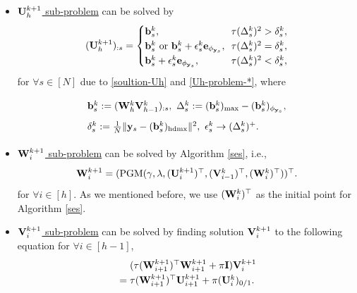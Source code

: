 \documentclass[journal]{IEEEtran}
\def\I{{\bf I}}
\def\U{{\bf U}}
\def\V{{\bf V}}
\def\W{{\bf W}}
\def\b{{\bf b}}
\def\e{{\bf e}}
\def\hd{{\rm hdmx}}
\def\y{{\bf y}}
\begin{document}
\begin{itemize}[leftmargin=10pt]
\item \underline{$\U_h^{k+1}$ sub-problem} can be solved by
\begin{eqnarray}\label{soultion-Uh-k1}
 \arraycolsep=0pt\def\arraystretch{1.25}
 (\U_h^{k+1})_{:s}=  \left\{\begin{array}{lll}
\b^{k}_s, & \tau  (\Delta_s^k)^2 > \delta_s^k,\\
\b^{k}_s~ \text{or}~\b^{k}_s+\epsilon^{k}_s \e_{\phi_{\y_s}}, ~~& \tau (\Delta_s^k)^2  = \delta_s^k,\\
 \b^{k}_s+\epsilon^{k}_s \e_{{\phi_{\y_s}}}, & \tau  (\Delta_s^k)^2  < \delta_s^k,
\end{array}\right.
\end{eqnarray}
for $\forall s\in[N]$ due to \eqref{soultion-Uh} and \eqref{Uh-problem-*}, where
\begin{eqnarray*}
 \arraycolsep=1.4pt\def\arraystretch{1.75}
\begin{array}{l}
\b^{k}_s:=(\W_h^{k}\V_{h-1}^{k})_{:s},~\Delta_s^k:=(\b^{k}_s)_{\max}-(\b^{k}_s)_{\phi_{\y_s}}, \\
\delta_s^k:=\frac{1}{N}\|\y_s-(\b^{k}_s)_\hd \|^2,~ \epsilon^{k}_s\to(\Delta_s^k)^+.
\end{array}
\end{eqnarray*}
\item \underline{$\W_i^{k+1}$ sub-problem} can be solved by Algorithm \ref{ses}, i.e.,
\begin{eqnarray}\label{soultion-Wi-k1}
 \arraycolsep=0pt\def\arraystretch{1.25}
 \begin{array}{l}
 \W_i^{k+1}= (\text{PGM}( \gamma, \lambda, (\U_i^{k+1})^{\top}, (\V_{i-1}^k)^{\top},  (\W^k_{i} )^{\top}))^\top.
\end{array} \end{eqnarray}
for $\forall i\in[h]$. As we mentioned before, we use $(\W^k_{i} )^{\top}$ as the initial point for Algorithm \ref{ses}.
\item \underline{$\V_i^{k+1}$ sub-problem} can be solved by finding solution $\V_i^{k+1}$ to the following equation for  $\forall i\in[h-1]$,
\begin{eqnarray}\label{soultion-Vi-k1}
 \arraycolsep=1.4pt\def\arraystretch{1.25}
 \begin{array}{lll}
&&( \tau(\W_{i+1}^{k+1})^\top \W_{i+1}^{k+1}+\pi \I ) \V_i^{k+1}\\
&=&   \tau(\W_{i+1}^{k+1})^\top\U_{i+1}^{k+1} +\pi(\U_{i}^k)_{0/1}.
 \end{array}\end{eqnarray}

\end{itemize}
\end{document}
